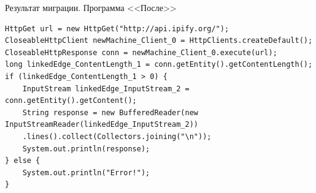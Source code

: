 \documentclass[12pt]{beamer}
\begin{document}
\begin{frame}[fragile]{Результат миграции. Программа <<После>>}
\begin{verbatim}
HttpGet url = new HttpGet("http://api.ipify.org/");
CloseableHttpClient newMachine_Client_0 = HttpClients.createDefault();
CloseableHttpResponse conn = newMachine_Client_0.execute(url);
long linkedEdge_ContentLength_1 = conn.getEntity().getContentLength();
if (linkedEdge_ContentLength_1 > 0) {
    InputStream linkedEdge_InputStream_2 = conn.getEntity().getContent();
    String response = new BufferedReader(new InputStreamReader(linkedEdge_InputStream_2))
    .lines().collect(Collectors.joining("\n"));
    System.out.println(response);
} else {
    System.out.println("Error!");
}
\end{verbatim}
\end{frame}
\end{document}
